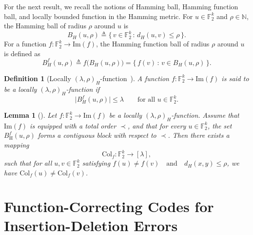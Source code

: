 \documentclass[11 pt]{article}
\numberwithin{equation}{section}
\newtheorem{lemma}[theorem]{Lemma}
\newtheorem{definition}[theorem]{Definition}
\begin{document}
    \noindent
    For the next result, we recall the notions of Hamming ball, Hamming function ball, and locally bounded function in the Hamming metric. For $u \in \mathbb{F}_2^k$ and $\rho \in \mathbb{N}$, the Hamming ball of radius $\rho$ around $u$ is
    \[
    B_H(u, \rho) \triangleq 
    \{\, v \in \mathbb{F}_2^k \,:\, d_H(u, v) \leq \rho \,\}.
    \]
    \noindent
    For a function $f : \mathbb{F}_2^k \to \mathrm{Im}(f)$, the Hamming function ball of radius $\rho$ around $u$ is defined as
    \[
    B^f_H(u, \rho) \triangleq f\!\big(B_H(u, \rho)\big) 
    = \{\, f(v) \,:\, v \in B_H(u, \rho) \,\}.
    \]

    \begin{definition}[Locally $(\lambda, \rho)_H$-function~\cite{Rajput2025}]
    \label{def:local-H}
    A function $f : \mathbb{F}_2^k \to \mathrm{Im}(f)$ is said to be a 
    locally $(\lambda, \rho)_H$-function if 
    \[
    \big|B^f_H(u, \rho)\big| \leq \lambda 
    \qquad \text{for all } u \in \mathbb{F}_2^k.
    \]
    \end{definition}
    
    \begin{lemma}[\cite{Rajput2025}]\label{graph_color_function}
        Let $f : \mathbb{F}_2^k \rightarrow \mathrm{Im}(f)$ be a locally $(\lambda, \rho)_H$-function. 
        Assume that $\mathrm{Im}(f)$ is equipped with a total order $\prec$, and that for every $u \in \mathbb{F}_2^k$, the set $B_{\mathrm{H}}^f(u,\rho)$
        forms a contiguous block with respect to $\prec$.
        Then there exists a mapping
        \[
            \mathrm{Col}_f : \mathbb{F}_2^k \rightarrow [\lambda],
        \]
        such that for all $u,v \in \mathbb{F}_2^k$ satisfying $f(u) \neq f(v) \quad \text{and} \quad d_{H}(x,y) \leq \rho$, we have $\mathrm{Col}_f(u) \neq \mathrm{Col}_f(v)$.
    \end{lemma}

  
\section{Function-Correcting Codes for Insertion-Deletion Errors}
    
\end{document}

